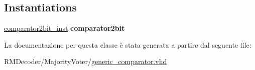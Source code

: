 \subsection*{Instantiations}
 \begin{DoxyCompactItemize}
\item 
\hypertarget{classgeneric__comparator_1_1_structural_af74a2994eaa4c0144a6fb8e322285d1d}{\hyperlink{classgeneric__comparator_1_1_structural_af74a2994eaa4c0144a6fb8e322285d1d}{comparator2bit\+\_\+inst}  {\bfseries comparator2bit}   }\label{classgeneric__comparator_1_1_structural_af74a2994eaa4c0144a6fb8e322285d1d}

\end{DoxyCompactItemize}


La documentazione per questa classe è stata generata a partire dal seguente file\+:\begin{DoxyCompactItemize}
\item 
R\+M\+Decoder/\+Majority\+Voter/\hyperlink{generic__comparator_8vhd}{generic\+\_\+comparator.\+vhd}\end{DoxyCompactItemize}
